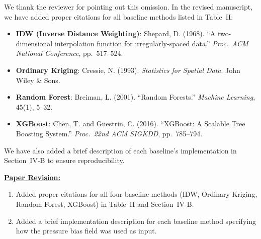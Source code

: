 We thank the reviewer for pointing out this omission. In the revised manuscript, we have added proper citations for all baseline methods listed in Table~II:
\begin{itemize}
    \item \textbf{IDW (Inverse Distance Weighting)}: Shepard, D. (1968). ``A two-dimensional interpolation function for irregularly-spaced data.'' \textit{Proc.\ ACM National Conference}, pp.~517--524.
    \item \textbf{Ordinary Kriging}: Cressie, N. (1993). \textit{Statistics for Spatial Data}. John Wiley \& Sons.
    \item \textbf{Random Forest}: Breiman, L. (2001). ``Random Forests.'' \textit{Machine Learning}, 45(1), 5--32.
    \item \textbf{XGBoost}: Chen, T. and Guestrin, C. (2016). ``XGBoost: A Scalable Tree Boosting System.'' \textit{Proc.\ 22nd ACM SIGKDD}, pp.~785--794.
\end{itemize}

We have also added a brief description of each baseline's implementation in Section~IV-B to ensure reproducibility.

\vspace{0.1cm}
\noindent
\underline{\textbf{Paper Revision:}}

\begin{enumerate}
    \item Added proper citations for all four baseline methods (IDW, Ordinary Kriging, Random Forest, XGBoost) in Table~II and Section~IV-B.
    \item Added a brief implementation description for each baseline method specifying how the pressure bias field was used as input.
\end{enumerate}
